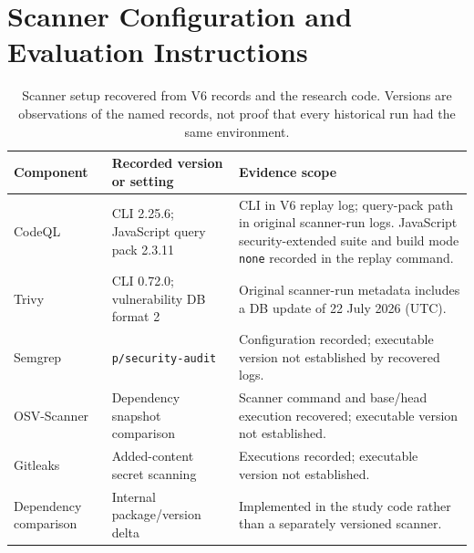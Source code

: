 \section{Scanner Configuration and Evaluation Instructions}\label{sec:s7}
\begin{table}[H]
\caption{Scanner setup recovered from V6 records and the research code. Versions are observations of the named records, not proof that every historical run had the same environment.}
\label{tab:scanner-env}
\footnotesize\renewcommand{\arraystretch}{1.13}
\begin{tabularx}{\linewidth}{@{}L{2cm}L{3.0cm}Y@{}}
\toprule
\textbf{Component} & \textbf{Recorded version or setting} & \textbf{Evidence scope}\\
\midrule
CodeQL & CLI 2.25.6; JavaScript query pack 2.3.11 & CLI in V6 replay log; query-pack path in original scanner-run logs. JavaScript security-extended suite and build mode \texttt{none} recorded in the replay command.\\
Trivy & CLI 0.72.0; vulnerability DB format 2 & Original scanner-run metadata includes a DB update of 22 July 2026 (UTC).\\
Semgrep & \texttt{p/security-audit} & Configuration recorded; executable version not established by recovered logs.\\
OSV-Scanner & Dependency snapshot comparison & Scanner command and base/head execution recovered; executable version not established.\\
Gitleaks & Added-content secret scanning & Executions recorded; executable version not established.\\
Dependency comparison & Internal package/version delta & Implemented in the study code rather than a separately versioned scanner.\\
\bottomrule
\end{tabularx}
\end{table}


